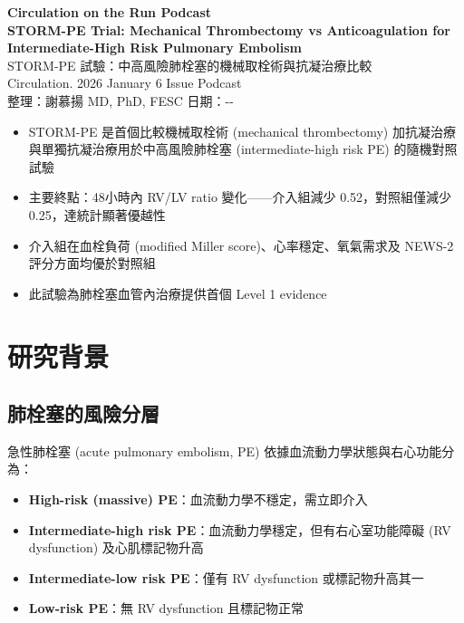 \documentclass[12pt,a4paper]{article}
\newcommand{\keyfinding}[1]{
    \par
    \noindent
    \begin{tcolorbox}[
        colback=yellow!10!white,
        colframe=orange!75!black,
        title=\textbf{核心發現摘要},
        fonttitle=\bfseries,
        boxrule=0.5pt,
        arc=3pt
    ]
    #1
    \end{tcolorbox}
}
\newcommand{\mydate}{\the\year-\the\month-\the\day}
\begin{document}
\begin{center}
{\LARGE\bfseries\textcolor{emergency_red}{Circulation on the Run Podcast}}\\[0.5cm]
{\Large\textbf{STORM-PE Trial: Mechanical Thrombectomy vs Anticoagulation for Intermediate-High Risk Pulmonary Embolism}}\\[0.3cm]
{\large STORM-PE 試驗：中高風險肺栓塞的機械取栓術與抗凝治療比較}\\[0.5cm]
{\normalsize Circulation. 2026 January 6 Issue Podcast}\\[0.3cm]
{\normalsize 整理：謝慕揚 MD, PhD, FESC \quad 日期：\mydate}
\end{center}

\vspace{0.5cm}

\keyfinding{
\begin{itemize}[leftmargin=*]
    \item STORM-PE 是首個比較機械取栓術 (mechanical thrombectomy) 加抗凝治療與單獨抗凝治療用於中高風險肺栓塞 (intermediate-high risk PE) 的隨機對照試驗
    \item 主要終點：48小時內 RV/LV ratio 變化——介入組減少 0.52，對照組僅減少 0.25，達統計顯著優越性
    \item 介入組在血栓負荷 (modified Miller score)、心率穩定、氧氣需求及 NEWS-2 評分方面均優於對照組
    \item 此試驗為肺栓塞血管內治療提供首個 Level 1 evidence
\end{itemize}
}

\section{研究背景}

\subsection{肺栓塞的風險分層}

急性肺栓塞 (acute pulmonary embolism, PE) 依據血流動力學狀態與右心功能分為：
\begin{itemize}
    \item \textbf{High-risk (massive) PE}：血流動力學不穩定，需立即介入
    \item \textbf{Intermediate-high risk PE}：血流動力學穩定，但有右心室功能障礙 (RV dysfunction) 及心肌標記物升高
    \item \textbf{Intermediate-low risk PE}：僅有 RV dysfunction 或標記物升高其一
    \item \textbf{Low-risk PE}：無 RV dysfunction 且標記物正常
\end{itemize}
\end{document}
